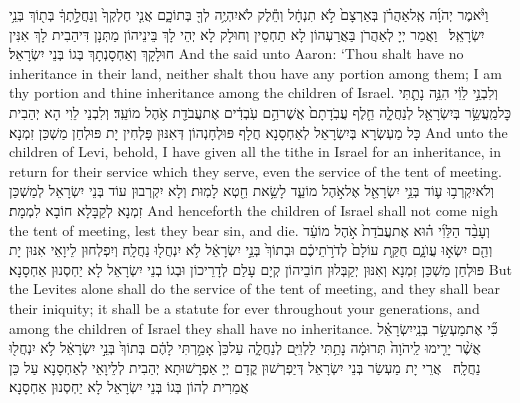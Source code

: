 {וַיֹּ֨אמֶר יְהֹוָ֜ה אֶֽל\maqqaf אַהֲרֹ֗ן בְּאַרְצָם֙ לֹ֣א תִנְחָ֔ל וְחֵ֕לֶק לֹא\maqqaf יִהְיֶ֥ה לְךָ֖ בְּתוֹכָ֑ם אֲנִ֤י חֶלְקְךָ֙ וְנַחֲלָ֣תְךָ֔ בְּת֖וֹךְ בְּנֵ֥י יִשְׂרָאֵֽל׃ \setuma }
{וַאֲמַר יְיָ לְאַהֲרֹן בַּאֲרַעְהוֹן לָא תַחְסֵין וְחוּלָק לָא יְהֵי לָךְ בֵּינֵיהוֹן מַתְּנָן דִּיהַבִית לָךְ אִנִּין חוּלָקָךְ וְאַחְסָנְתָךְ בְּגוֹ בְּנֵי יִשְׂרָאֵל׃}
{And the \lord\space said unto Aaron: ‘Thou shalt have no inheritance in their land, neither shalt thou have any portion among them; I am thy portion and thine inheritance among the children of Israel.}{}
{וְלִבְנֵ֣י לֵוִ֔י הִנֵּ֥ה נָתַ֛תִּי כׇּל\maqqaf מַֽעֲשֵׂ֥ר בְּיִשְׂרָאֵ֖ל לְנַחֲלָ֑ה חֵ֤לֶף עֲבֹֽדָתָם֙ אֲשֶׁר\maqqaf הֵ֣ם עֹֽבְדִ֔ים אֶת\maqqaf עֲבֹדַ֖ת אֹ֥הֶל מוֹעֵֽד׃}
{וְלִבְנֵי לֵוִי הָא יְהַבִית כָּל מַעְשְׂרָא בְּיִשְׂרָאֵל לְאַחְסָנָא חֲלָף פּוּלְחָנְהוֹן דְּאִנּוּן פָּלְחִין יָת פּוּלְחַן מַשְׁכַּן זִמְנָא׃}
{And unto the children of Levi, behold, I have given all the tithe in Israel for an inheritance, in return for their service which they serve, even the service of the tent of meeting.}{}
{וְלֹא\maqqaf יִקְרְב֥וּ ע֛וֹד בְּנֵ֥י יִשְׂרָאֵ֖ל אֶל\maqqaf אֹ֣הֶל מוֹעֵ֑ד לָשֵׂ֥את חֵ֖טְא לָמֽוּת׃}
{וְלָא יִקְרְבוּן עוֹד בְּנֵי יִשְׂרָאֵל לְמַשְׁכַּן זִמְנָא לְקַבָּלָא חוֹבָא לִמְמָת׃}
{And henceforth the children of Israel shall not come nigh the tent of meeting, lest they bear sin, and die.}{}
{וְעָבַ֨ד הַלֵּוִ֜י ה֗וּא אֶת\maqqaf עֲבֹדַת֙ אֹ֣הֶל מוֹעֵ֔ד וְהֵ֖ם יִשְׂא֣וּ עֲוֺנָ֑ם חֻקַּ֤ת עוֹלָם֙ לְדֹרֹ֣תֵיכֶ֔ם וּבְתוֹךְ֙ בְּנֵ֣י יִשְׂרָאֵ֔ל לֹ֥א יִנְחֲל֖וּ נַחֲלָֽה׃}
{וְיִפְלְחוּן לֵיוָאֵי אִנּוּן יָת פּוּלְחַן מַשְׁכַּן זִמְנָא וְאִנּוּן יְקַבְּלוּן חוֹבֵיהוֹן קְיָם עָלַם לְדָרֵיכוֹן וּבְגוֹ בְנֵי יִשְׂרָאֵל לָא יַחְסְנוּן אַחְסָנָא׃}
{But the Levites alone shall do the service of the tent of meeting, and they shall bear their iniquity; it shall be a statute for ever throughout your generations, and among the children of Israel they shall have no inheritance.}{}
{כִּ֞י אֶת\maqqaf מַעְשַׂ֣ר בְּנֵֽי\maqqaf יִשְׂרָאֵ֗ל אֲשֶׁ֨ר יָרִ֤ימוּ לַֽיהֹוָה֙ תְּרוּמָ֔ה נָתַ֥תִּי לַלְוִיִּ֖ם לְנַחֲלָ֑ה עַל\maqqaf כֵּן֙ אָמַ֣רְתִּי לָהֶ֔ם בְּתוֹךְ֙ בְּנֵ֣י יִשְׂרָאֵ֔ל לֹ֥א יִנְחֲל֖וּ נַחֲלָֽה׃ \petucha }
{אֲרֵי יָת מַעְשַׂר בְּנֵי יִשְׂרָאֵל דְּיַפְרְשׁוּן קֳדָם יְיָ אַפְרָשׁוּתָא יְהַבִית לְלֵיוָאֵי לְאַחְסָנָא עַל כֵּן אֲמַרִית לְהוֹן בְּגוֹ בְּנֵי יִשְׂרָאֵל לָא יַחְסְנוּן אַחְסָנָא׃}
